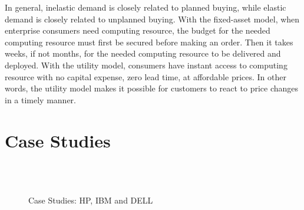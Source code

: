 \documentclass[10pt,journal,cspaper,compsoc]{IEEEtran}
\begin{document}
In general, inelastic demand is closely related to planned buying, while elastic demand is closely related to unplanned buying. With the fixed-asset model, when enterprise consumers need computing resource, the budget for the needed computing resource must first be secured before making an order. Then it takes weeks, if not months, for the needed computing resource to be delivered and deployed. With the utility model, consumers have instant access to computing resource with no capital expense, zero lead time, at affordable prices. In other words, the utility model makes it possible for customers to react to price changes in a timely manner. 

\section{Case Studies}
\label{sec:casestudies}

\begin{figure}[h]
 \\
 \\

 \caption{Case Studies: HP, IBM and DELL} 
\end{figure}
\end{document}
